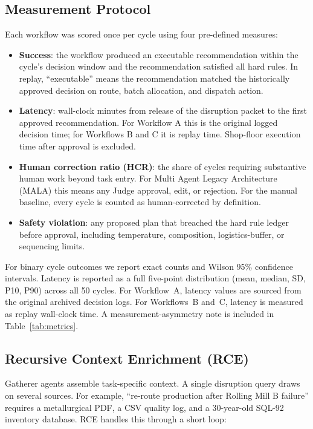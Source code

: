 \documentclass[conference]{IEEEtran}
\newcommand{\MALA}{Multi Agent Legacy Architecture (MALA)}
\begin{document}
\subsection{Measurement Protocol}

Each workflow was scored once per cycle using four pre-defined measures:
\begin{itemize}
  \item \textbf{Success}: the workflow produced an executable recommendation within the cycle's decision window and the recommendation satisfied all hard rules. In replay, ``executable'' means the recommendation matched the historically approved decision on route, batch allocation, and dispatch action.
  \item \textbf{Latency}: wall-clock minutes from release of the disruption packet to the first approved recommendation. For Workflow A this is the original logged decision time; for Workflows B and C it is replay time. Shop-floor execution time after approval is excluded.
  \item \textbf{Human correction ratio (HCR)}: the share of cycles requiring substantive human work beyond task entry. For \MALA{} this means any Judge approval, edit, or rejection. For the manual baseline, every cycle is counted as human-corrected by definition.
  \item \textbf{Safety violation}: any proposed plan that breached the hard rule ledger before approval, including temperature, composition, logistics-buffer, or sequencing limits.
\end{itemize}

For binary cycle outcomes we report exact counts and Wilson 95\% confidence intervals. Latency is reported as a full five-point distribution (mean, median, SD, P10, P90) across all 50 cycles. For Workflow~A, latency values are sourced from the original archived decision logs. For Workflows~B and~C, latency is measured as replay wall-clock time. A measurement-asymmetry note is included in Table~\ref{tab:metrics}.

\subsection{Recursive Context Enrichment (RCE)}\label{sec:rce}

Gatherer agents assemble task-specific context. A single disruption query draws on several sources. For example, ``re-route production after Rolling Mill B failure'' requires a metallurgical PDF, a CSV quality log, and a 30-year-old SQL-92 inventory database. RCE handles this through a short loop:
\end{document}
